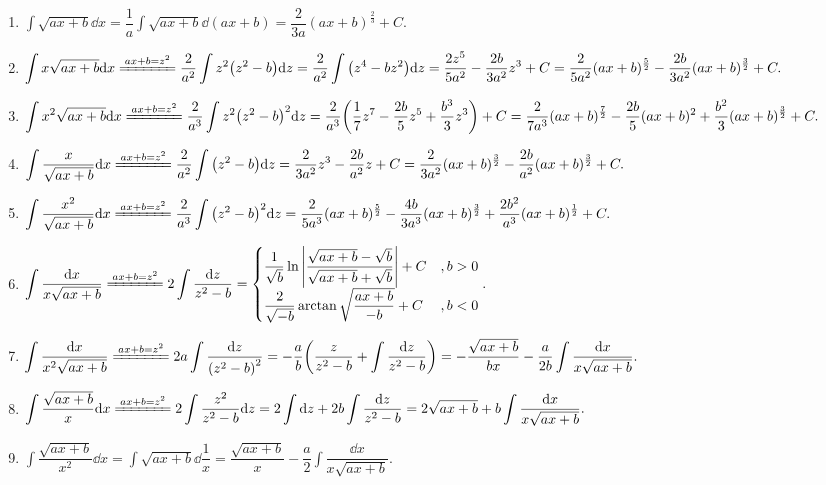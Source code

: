 \begin{enumerate}[label=\roman{*}.]
    \item $\displaystyle\int\sqrt{ax+b}\dd x=\dfrac{1}{a}\int\sqrt{ax+b}\dd (ax+b)=\dfrac{2}{3a}(ax+b)^{\frac{2}{3}}+C.$
    \item $\displaystyle \int x\sqrt{ax+b}\dd x \xlongequal{ax+b=z^2}\dfrac{2}{a^2}\int z^2\qty(z^2-b)\dd z=\dfrac{2}{a^2}\int\qty(z^4-bz^2)\dd z=\dfrac{2z^5}{5a^2}-\dfrac{2b}{3a^2}z^3+C=\dfrac{2}{5a^2}(ax+b)^{\frac{5}{2}}-\dfrac{2b}{3a^2}(ax+b)^{\frac{3}{2}}+C.$
    \item $\displaystyle \int x^2\sqrt{ax+b}\dd x \xlongequal{ax+b=z^2}\dfrac{2}{a^3}\int z^2\qty(z^2-b)^2\dd z=\dfrac{2}{a^3}\qty(\dfrac{1}{7}z^7-\dfrac{2b}{5}z^5+\dfrac{b^3}{3}z^3)+C=\dfrac{2}{7a^3}(ax+b)^{\frac{7}{2}}-\dfrac{2b}{5}(ax+b)^2+\dfrac{b^2}{3}(ax+b)^{\frac{3}{2}}+C.$
    \item $\displaystyle \int\dfrac{x}{\sqrt{ax+b}}\dd x \xlongequal{ax+b=z^2}\dfrac{2}{a^2}\int\qty(z^2-b)\dd z=\dfrac{2}{3a^2}z^3-\dfrac{2b}{a^2}z+C=\dfrac{2}{3a^2}(ax+b)^{\frac{3}{2}}-\dfrac{2b}{a^2}(ax+b)^{\frac{3}{2}}+C.$
    \item $\displaystyle \int\dfrac{x^2}{\sqrt{ax+b}}\dd x \xlongequal{ax+b=z^2}\dfrac{2}{a^3}\int\qty(z^2-b)^2\dd z=\dfrac{2}{5a^3}(ax+b)^{\frac{5}{2}}-\dfrac{4b}{3a^3}(ax+b)^{\frac{3}{2}}+\dfrac{2b^2}{a^3}(ax+b)^{\frac{1}{2}}+C.$
    \item $\displaystyle \int\dfrac{\dd x}{x\sqrt{ax+b}} \xlongequal{ax+b=z^2}2\int\dfrac{\dd z}{z^2-b}=\begin{cases}
                  \dfrac{1}{\sqrt{b}}\ln\qty|\dfrac{\sqrt{ax+b}-\sqrt{b}}{\sqrt{ax+b}+\sqrt{b}}|+C & ,b>0 \\[6pt]
                  \dfrac{2}{\sqrt{-b}}\arctan\sqrt{\dfrac{ax+b}{-b}}+C                             & ,b<0
              \end{cases}.$
    \item $\displaystyle \int\dfrac{\dd x}{x^2\sqrt{ax+b}} \xlongequal{ax+b=z^2}2a\int\dfrac{\dd z}{\qty(z^2-b)^2}=-\dfrac{a}{b}\qty(\dfrac{z}{z^2-b}+\int\dfrac{\dd z}{z^2-b})=-\dfrac{\sqrt{ax+b}}{bx}-\dfrac{a}{2b}\int\dfrac{\dd x}{x\sqrt{ax+b}}.$
    \item $\displaystyle \int\dfrac{\sqrt{ax+b}}{x}\dd x \xlongequal{ax+b=z^2}2\int\dfrac{z^2}{z^2-b}\dd z=2\int\dd z+2b\int\dfrac{\dd z}{z^2-b}=2\sqrt{ax+b}+b\int\dfrac{\dd x}{x\sqrt{ax+b}}.$
    \item $\displaystyle \int\dfrac{\sqrt{ax+b}}{x^2}\dd x =\int\sqrt{ax+b}\dd \dfrac{1}{x}=\dfrac{\sqrt{ax+b}}{x}-\dfrac{a}{2}\int\dfrac{\dd x}{x\sqrt{ax+b}}.$
\end{enumerate}

